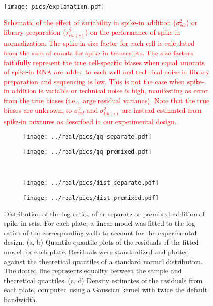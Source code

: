 \documentclass{article}
\newcommand\revised[1]{\textcolor{red}{#1}}
\begin{document}
\begin{figure}[btp]
    \begin{center}
        \texttt{[image: pics/explanation.pdf]}
    \end{center}
    \caption{\revised{Schematic of the effect of variability in spike-in addition ($\sigma^2_{vol}$) or library preparation ($\sigma^2_{lib(s)}$) on the performance of spike-in normalization.
        The spike-in size factor for each cell is calculated from the sum of counts for spike-in transcripts.
        The size factors faithfully represent the true cell-specific biases when equal amounts of spike-in RNA are added to each well and technical noise in library preparation and sequencing is low.
        This is not the case when spike-in addition is variable or technical noise is high, manifesting as error from the true biases (i.e., large residual variance).
    Note that the true biases are unknown, so $\sigma^2_{vol}$ and $\sigma^2_{lib(s)}$ are instead estimated from spike-in mixtures as described in our experimental design.}
    }
\end{figure}

\begin{figure}[btp]
    \begin{center}
        \begin{subfigure}{0.49\textwidth}
            \texttt{[image: ../real/pics/qq\_separate.pdf]}
            \caption{}
        \end{subfigure}
        \begin{subfigure}{0.49\textwidth}
            \texttt{[image: ../real/pics/qq\_premixed.pdf]}
            \caption{}
        \end{subfigure} \\[0.1in]
        \begin{subfigure}{0.49\textwidth}
            \texttt{[image: ../real/pics/dist\_separate.pdf]}
            \caption{}
        \end{subfigure}
        \begin{subfigure}{0.49\textwidth}
            \texttt{[image: ../real/pics/dist\_premixed.pdf]}
            \caption{}
        \end{subfigure}
    \end{center}
    \caption{
        Distribution of the log-ratios after separate or premixed addition of spike-in sets.
        For each plate, a linear model was fitted to the log-ratios of the corresponding wells to account for the experimental design.
        (a, b) Quantile-quantile plots of the residuals of the fitted model for each plate.
        Residuals were standardized and plotted against the theoretical quantiles of a standard normal distribution.
        The dotted line represents equality between the sample and theoretical quantiles.
        (c, d) Density estimates of the residuals from each plate, computed using a Gaussian kernel with twice the default bandwidth.
    }
\end{figure}
\end{document}
